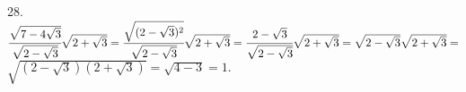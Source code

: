 28. $\cfrac{\sqrt{7-4\sqrt{3}}}{\sqrt{2-\sqrt{3}}}\sqrt{2+\sqrt{3}}=
\cfrac{\sqrt{(2-\sqrt{3})^2}}{\sqrt{2-\sqrt{3}}}\sqrt{2+\sqrt{3}}=\cfrac{2-\sqrt{3}}{\sqrt{2-\sqrt{3}}}\sqrt{2+\sqrt{3}}=
\sqrt{2-\sqrt{3}}\sqrt{2+\sqrt{3}}=$\\$\sqrt{(2-\sqrt{3})(2+\sqrt{3})}=\sqrt{4-3}=1.$\\
